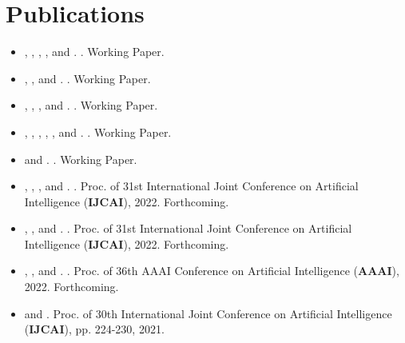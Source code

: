 \documentclass{article}
\newcommand{\link}[2]{\iftoggle{uselinks}{\href{#1}{#2}}{#2}\xspace}
\newcommand{\itlink}[2]{\link{https://daniel-halpern.com/files/#1.pdf}{\textit{#2}}}
\newcommand{\me}{\link{https://daniel-halpern.com}{D. Halpern}}
\newcommand{\nisarg}{\link{https://www.cs.toronto.edu/~nisarg}{N. Shah}}
\newcommand{\ariel}{\link{http://procaccia.info}{A. D. Procaccia}}
\newcommand{\alex}{\link{https://www.alexpsomas.com}{A. Psomas}}
\newcommand{\greg}{\link{https://gregorykehne.com}{G. Kehne}}
\newcommand{\manon}{\link{https://manrev.github.io/manon/}{M. Revel}}
\newcommand{\tao}{\link{https://tao-l.github.io}{T. Lin}}
\newcommand{\jamie}{\link{http://www.jamie.tuckerfoltz.com}{J. Tucker-Foltz}}
\newcommand{\dad}{\link{https://www.cs.cornell.edu/home/halpern/}{J. Y. Halpern}}
\newcommand{\ali}{\link{https://jadbabaie.mit.edu}{A. Jadbabaie}}
\newcommand{\elchanan}{\link{https://math.mit.edu/~elmos/}{E. Mossel}}
\newcommand{\allan}{\link{https://www.cs.toronto.edu/~bor/}{A. Borodin}}
\newcommand{\mohamad}{\link{https://www.cs.toronto.edu/~latifian/}{M. Latifian}}
\newcommand{\adam}{\link{https://polisci.mit.edu/people/adam-berinsky}{A. Berinsky}}
\newcommand{\gerdus}{\link{http://www.gerdusbenade.com}{G. Benadè}}
\newcommand{\manuel}{\link{https://ei.is.mpg.de/~mwuthrich}{Manuel W\"uthrich}}
\begin{document}
    \section{Publications}
    \begin{itemize}
        \setlength\itemsep{.8ex}
        \item \me, \greg, \ariel, \jamie, and \manuel. \itlink{representation-incomplete}{Representation with Incomplete Votes}. Working Paper.
        \item \gerdus, \me, and \alex. \itlink{dynamic-fair-division}{Dynamic Fair Division with Partial Information}. Working Paper.
        
        \item \manon, \me, \adam, and \ali. \itlink{liquid-in-practice}{Liquid Democracy in Practice: An Empirical Analysis of its Epistemic Performance}. Working Paper.
        
        \item \me, \dad, \ali, \elchanan, \ariel, and \manon. \itlink{liquid-defense}{In Defense of Fluid Democracy}. Working Paper.

        \item \me and \ariel. \itlink{unbiased-information}{Unbiased Information Packets}. Working Paper.

        \item \allan, \me, \mohamad, and \nisarg. \itlink{distortion-top-t}{Distortion in Voting with Top-t Preferences}. Proc. of 31st International Joint Conference on Artificial Intelligence (\textbf{IJCAI}), 2022. Forthcoming.
        
        \item \me, \greg, and \jamie. \itlink{buyers-reveal}{Can Buyers Reveal for a Better Deal?}. Proc. of 31st International Joint Conference on Artificial Intelligence (\textbf{IJCAI}), 2022. Forthcoming.
        
        \item \manon, \tao, and \me. \itlink{optimal-congress}{How Many Representatives Do We Need? The Optimal Size of an Epistemic Congress}.
        Proc. of 36th AAAI Conference on Artificial Intelligence (\textbf{AAAI}), 2022. Forthcoming. 
        
        \item \me and \nisarg \itlink{distortion-fair-division}{Fair and Efficient Resource Allocation with Partial Information}.
        Proc. of 30th International Joint Conference on Artificial Intelligence (\textbf{IJCAI}), pp. 224-230, 2021. 
        

\end{itemize}
\end{document}

